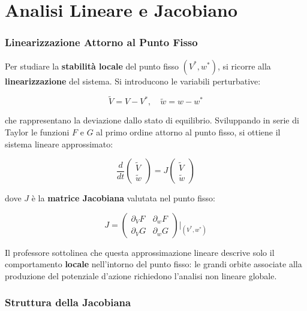 \section{Analisi Lineare e Jacobiano}

\subsubsection{Linearizzazione Attorno al Punto Fisso}

Per studiare la \textbf{stabilità locale} del punto fisso $(V^*, w^*)$, si ricorre alla \textbf{linearizzazione} del sistema. Si introducono le variabili perturbative:

\begin{equation}
\tilde{V} = V - V^*, \quad \tilde{w} = w - w^*
\end{equation}

che rappresentano la deviazione dallo stato di equilibrio. Sviluppando in serie di Taylor le funzioni $F$ e $G$ al primo ordine attorno al punto fisso, si ottiene il sistema lineare approssimato:

\begin{equation}
\frac{d}{dt}\begin{pmatrix} \tilde{V} \\ \tilde{w} \end{pmatrix} = J \begin{pmatrix} \tilde{V} \\ \tilde{w} \end{pmatrix}
\end{equation}

dove $J$ è la \textbf{matrice Jacobiana} valutata nel punto fisso:

\begin{equation}
J = \begin{pmatrix} \partial_V F & \partial_w F \\ \partial_V G & \partial_w G \end{pmatrix}\bigg|_{(V^*, w^*)}
\end{equation}

Il professore sottolinea che questa approssimazione lineare descrive solo il comportamento \textbf{locale} nell'intorno del punto fisso: le grandi orbite associate alla produzione del potenziale d'azione richiedono l'analisi non lineare globale.

\subsubsection{Struttura della Jacobiana}

